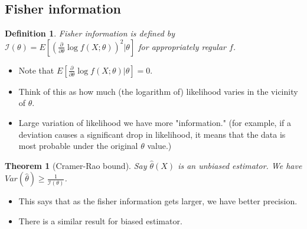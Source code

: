 \documentclass{article}
\newtheorem{theorem}{Theorem}
\newtheorem{definition}{Definition}
\theoremstyle{remark}
\begin{document}
\subsection{Fisher information}
\begin{definition}
Fisher information is defined by $\mathcal{I}(\theta)=E[(\frac \partial{\partial\theta}\log f(X;\theta))^2|\theta]$ for appropriately regular $f$.
\end{definition}

\begin{itemize}
\item Note that $E[\frac{\partial}{\partial\theta}\log f(X;\theta)|\theta]=0$.
\item Think of this as how much (the logarithm of) likelihood varies in the vicinity of $\theta$.
\item Large variation of likelihood we have more "information." (for example, if a deviation causes a significant drop in likelihood, 
it means that the data is most probable under the original $\theta$ value.)
\end{itemize}

\begin{theorem} [Cramer-Rao bound]
Say $\hat\theta(X)$ is an unbiased estimator. We have $Var(\hat\theta)\geq \frac 1{\mathcal{I}(\theta)}$.
\end{theorem}

\begin{itemize}
\item This says that as the fisher information gets larger, we have better precision.
\item There is a similar result for biased estimator.
\end{itemize}
\end{document}
